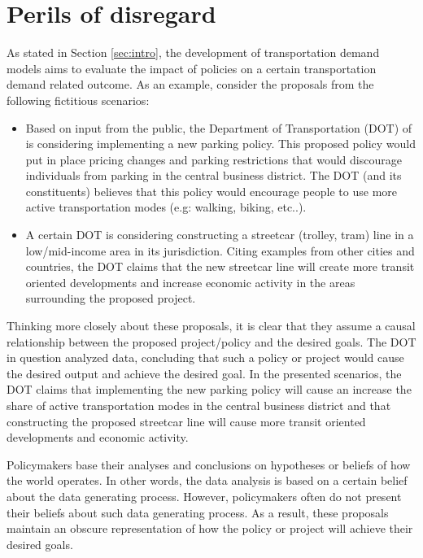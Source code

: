 \section{Perils of disregard}
\label{sec:graph-importance}

As stated in Section \ref{sec:intro}, the development of transportation demand models aims to evaluate the impact of policies on a certain
transportation demand related outcome. As an example, consider the proposals from the following fictitious scenarios:
\begin{itemize}
 \item Based on input from the public, the Department of Transportation (DOT) of  is considering implementing a new parking policy.
 This proposed policy would put in place pricing changes and parking restrictions that would discourage individuals from parking in the central business district.
 The DOT (and its constituents) believes that this policy would encourage people to use more active transportation modes (e.g: walking, biking, etc..).
 \item A certain DOT is considering constructing a streetcar (trolley, tram) line in a low/mid-income area in its jurisdiction.
 Citing examples from other cities and countries, the DOT claims that the new streetcar line will create more transit oriented developments and increase economic activity in the areas surrounding the proposed project.
 \end{itemize}


Thinking more closely about these proposals, it is clear that they assume a causal relationship between the proposed project/policy and the desired goals.
The DOT in question analyzed data, concluding that such a policy or project would cause the desired output and achieve the desired goal.
In the presented scenarios, the DOT claims that implementing the new parking policy will cause an increase the share of
active transportation modes in the central business district and that constructing the proposed streetcar line will
cause more transit oriented developments and economic activity.

Policymakers base their analyses and conclusions on hypotheses or beliefs of how the world operates.
In other words, the data analysis is based on a certain belief about the data generating process.
However, policymakers often do not present their beliefs about such data generating process.
As a result, these proposals maintain an obscure representation of how the policy or project will achieve their desired goals.

